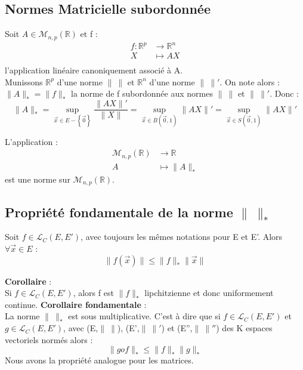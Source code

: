 \subsection{Normes Matricielle subordonnée}
Soit $A \in \mathcal{M}_{n,p}(\mathbb{R})$ et f : 
\begin{align*}
f : \mathbb{R}^p &\rightarrow \mathbb{R}^n\\
	X &\mapsto AX \\
\end{align*}
l'application linéaire canoniquement associé à A.\\
Munissons $\mathbb{R}^p$ d'une norme $\parallel~\parallel$ et $\mathbb{R}^n$ d'une norme $\parallel~\parallel'$. On note alors : $\parallel A\parallel_* = \parallel f \parallel_*$ la norme de f subordonnée aux normes $\parallel~\parallel$ et $\parallel~\parallel'$. Donc : 
$$\parallel A \parallel_* = \underset{\overrightarrow{x} \in E - \left\lbrace \overrightarrow{0}\right\rbrace}\sup \dfrac{\parallel AX \parallel'}{\parallel X\parallel} =  \underset{\overrightarrow{x} \in \overline{B}(\overrightarrow{0},1)}\sup \parallel AX \parallel' = \underset{\overrightarrow{x} \in S(\overrightarrow{0},1)}\sup \parallel AX \parallel'$$
\begin{prop}
L'application : 
\begin{align*}
\mathcal{M}_{n,p}(\mathbb{R}) &\rightarrow \mathbb{R} \\
A &\mapsto \parallel A\parallel_*
\end{align*}
est une norme sur $\mathcal{M}_{n,p}(\mathbb{R})$.
\end{prop}
\subsection{Propriété fondamentale de la norme $\parallel~\parallel_*$}
\begin{prop}
Soit $f \in \mathcal{L}_C(E,E')$, avec toujours les mêmes notations pour E et E'. Alors $\forall \overrightarrow{x} \in E$ :
$$\parallel f(\overrightarrow{x})\parallel \leq \parallel f \parallel_* \parallel \overrightarrow{x}\parallel$$
\end{prop}
\textbf{Corollaire} :\\
Si $f \in \mathcal{L}_C(E,E')$, alors f est $\parallel f \parallel_*$ lipchitzienne et donc uniformement continue.
\textbf{Corollaire fondamentale} : \\
La norme $\parallel~\parallel_*$ est sous multiplicative. C'est à dire que si $f \in \mathcal{L}_C(E,E')$ et $g \in \mathcal{L}_C(E,E')$, avec (E,$\parallel~ \parallel$), (E',$\parallel~\parallel'$) et (E'',$\parallel~\parallel''$) des K espaces vectoriels normés alors : 
$$\parallel gof \parallel_* \leq \parallel f\parallel_* \parallel g\parallel_*$$
Nous avons la propriété analogue pour les matrices.
